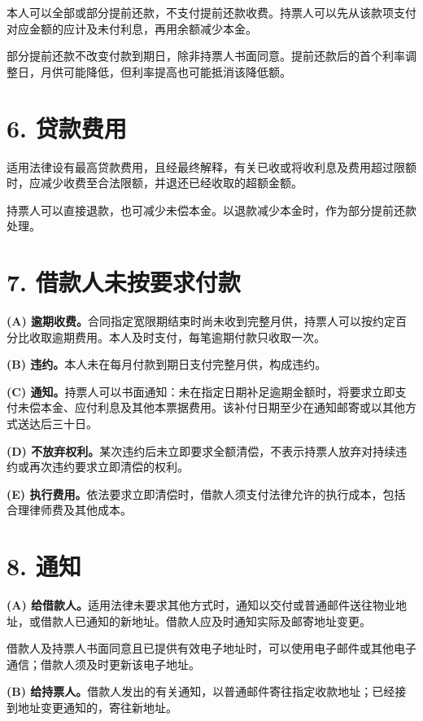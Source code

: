 \documentclass[UTF8,fontset=none,11pt,a4paper]{ctexart}
\begin{document}
本人可以全部或部分提前还款，不支付提前还款收费。持票人可以先从该款项支付对应金额的应计及未付利息，再用余额\allowbreak\mbox{减少本金。}


部分提前还款不改变付款到期日，除非持票人书面同意。提前还款后的首个利率调整日，月供可能降低，但利率提高也可能抵消\allowbreak\mbox{该降低额。}


\section*{6. 贷款费用}
适用法律设有最高贷款费用，且经最终解释，有关已收或将收利息及费用超过限额时，应减少收费至合法限额，并退还已经收取的\allowbreak\mbox{超额金额。}


持票人可以直接退款，也可减少未偿本金。以退款减少本金时，作为部分提前\allowbreak\mbox{还款处理。}


\section*{7. 借款人未按要求付款}
\textbf{(A) 逾期收费。}合同指定宽限期结束时尚未收到完整月供，持票人可以按约定百分比收取逾期费用。本人及时支付，每笔逾期付款只\allowbreak\mbox{收取一次。}


\textbf{(B) 违约。}本人未在每月付款到期日支付完整月供，\allowbreak\mbox{构成违约。}


\textbf{(C) 通知。}持票人可以书面通知：未在指定日期补足逾期金额时，将要求立即支付未偿本金、应付利息及其他本票据费用。该补付日期至少在通知邮寄或以其他方式送达\allowbreak\mbox{后三十日。}


\textbf{(D) 不放弃权利。}某次违约后未立即要求全额清偿，不表示持票人放弃对持续违约或再次违约要求立即清\allowbreak\mbox{偿的权利。}


\textbf{(E) 执行费用。}依法要求立即清偿时，借款人须支付法律允许的执行成本，包括合理律师费及\allowbreak\mbox{其他成本。}


\section*{8. 通知}
\textbf{(A) 给借款人。}适用法律未要求其他方式时，通知以交付或普通邮件送往物业地址，或借款人已通知的新地址。借款人应及时通知实际及邮寄\allowbreak\mbox{地址变更。}


借款人及持票人书面同意且已提供有效电子地址时，可以使用电子邮件或其他电子通信；借款人须及时更新该\allowbreak\mbox{电子地址。}


\textbf{(B) 给持票人。}借款人发出的有关通知，以普通邮件寄往指定收款地址；已经接到地址变更通知的，寄\allowbreak\mbox{往新地址。}
\end{document}
